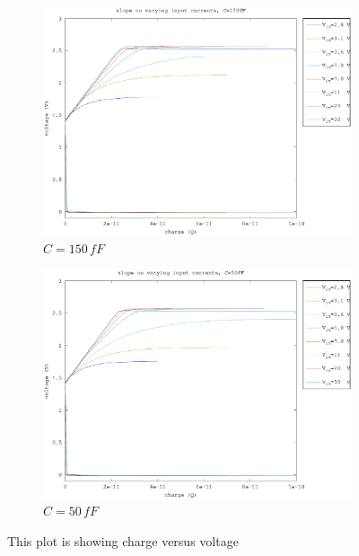 \documentclass{article}
\begin{document}
\begin{figure}[h]
\begin{subfigure}[b]{0.475\textwidth}
	    \centering 
	    \includegraphics[width=\textwidth]{fig/vbo_charge_150fF.eps}
	    \caption[]%
	    {$C=150\,fF$}    
	    \label{fig:vbo_charges_150fF}
	\end{subfigure}
	\quad
	\begin{subfigure}[b]{0.475\textwidth}   
	    \centering 
	    \includegraphics[width=\textwidth]{fig/vbo_charge_50fF.eps}
	    \caption[]%
	    {$C=50\,fF$}    
	    \label{fig:vbo_charges_50fF}
	\end{subfigure}
	\caption{This plot is showing charge versus voltage}
	\label{fig:vbo_charges}
\end{figure}
\end{document}
